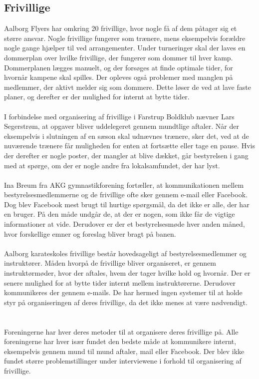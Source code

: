 \subsection*{Frivillige}
Aalborg Flyers har omkring 20 frivillige, hvor nogle få af dem påtager sig et større ansvar. Nogle frivillige fungerer som trænere, mens eksempelvis forældre nogle gange hjælper til ved arrangementer. Under turneringer skal der laves en dommerplan over hvilke frivillige, der fungerer som dommer til hver kamp. Dommerplanen lægges manuelt, og der forsøges at finde optimale tider, for hvornår kampene skal spilles. Der opleves også problemer med manglen på medlemmer, der aktivt melder sig som dommere. Dette løser de ved at lave faste planer, og derefter er der mulighed for internt at bytte tider.
\\\\
I forbindelse med organisering af frivillige i Farstrup Boldklub nævner Lars Segerstrøm, at opgaver bliver uddelegeret gennem mundtlige aftaler. Når der eksempelvis i slutningen af en sæson skal udnævnes trænere, sker det, ved at de nuværende trænere får muligheden for enten at fortsætte eller tage en pause. Hvis der derefter er nogle poster, der mangler at blive dækket, går bestyrelsen i gang med at spørge, om der er nogle andre fra lokalsamfundet, der har lyst.
\\\\
Ina Breum fra AKG gymnastikforening fortæller, at kommunikationen mellem bestyrelsesmedlemmerne og de frivillige ofte sker gennem e-mail eller Facebook. Dog blev Facebook mest brugt til hurtige spørgsmål, da det ikke er alle, der har en bruger. På den måde undgår de, at der er nogen, som ikke får de vigtige informationer at vide. Derudover er der et bestyrelsesmøde hver anden måned, hvor forskellige emner og foreslag bliver bragt på banen.
\\\\ %
Aalborg karateskoles frivillige består hovedsageligt af bestyrelsesmedlemmer og instruktører. Måden hvorpå de frivillige bliver organiseret, er gennem instruktørmøder, hvor der aftales, hvem der tager hvilke hold og hvornår. Der er senere mulighed for at bytte tider internt mellem instruktørerne. Derudover kommunikeres der gennem e-mails. De har hermed ingen systemer til at holde styr på organiseringen af deres frivillige, da det ikke menes at være nødvendigt.
\\\\\\
Foreningerne har hver deres metoder til at organisere deres frivillige på. Alle foreningerne har hver især fundet den bedste måde at kommunikere internt, eksempelvis gennem mund til mund aftaler, mail eller Facebook. Der blev ikke fundet større problemstillinger under interviewene i forhold til organisering af frivillige.

